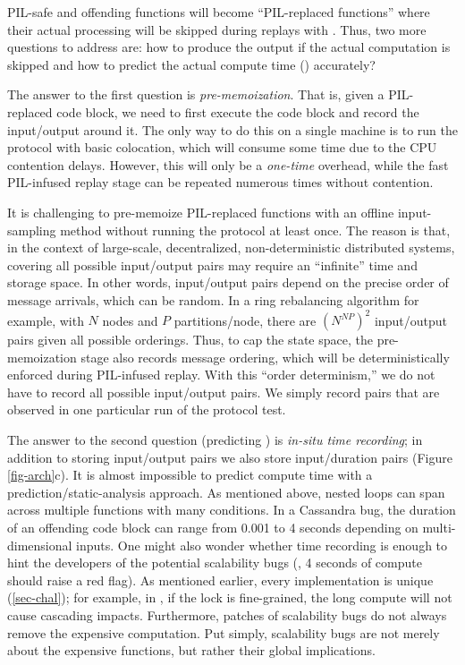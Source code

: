  PIL-safe and offending
functions will become ``PIL-replaced functions'' where their actual
processing will be skipped during replays with .
%
Thus, two more questions to address are: how to produce the output if the
actual computation is skipped and how to predict the actual compute time
() accurately?


The answer to the first question is {\em pre-memoization}.  That is, given
a PIL-replaced code block, we need to first execute the code block and
record the input/output around it.
%
The only way to do this on a single machine is to run the protocol with
basic colocation, which will consume some time due to the CPU contention
delays.
%
However, this will only be a {\em one-time} overhead, while the fast
PIL-infused replay stage can be repeated numerous times without
contention.



It is challenging to pre-memoize PIL-replaced functions with an offline
input-sampling method without running the protocol at least once.
%
The reason is that, in the context of large-scale, decentralized,
non-deterministic distributed systems, covering all possible input/output
pairs may require an ``infinite'' time and storage space.
%
In other words, input/output pairs depend on the precise order of message
arrivals, which can be random.
%
In a ring rebalancing algorithm for example, with $N$ nodes and $P$
partitions/node, there are $(N^{NP})^2$ input/output pairs given all
possible orderings.
%
Thus, to cap the state space, the pre-memoization stage also records
message ordering, which will be deterministically enforced during
PIL-infused replay.  With this ``order determinism,'' we do not have to
record all possible input/output pairs.  We simply record pairs that are
observed in one particular run of the protocol test.


The answer to the second question (predicting ) is {\em in-situ time
  recording}; in addition to storing input/output pairs we also store
input/duration pairs (Figure \ref{fig-arch}c).
%
It is almost impossible to predict compute time with a
prediction/static-analysis approach.
%
As mentioned above, nested loops can span across multiple functions with
many  conditions.  In a Cassandra bug, the duration of an
offending code block can range from 0.001 to 4 seconds depending on 
multi-dimensional inputs.
%
One might also wonder whether time recording is enough to hint the
developers of the potential scalability bugs (\eg, 4 seconds of compute
should raise a red flag).
%
As mentioned earlier, every implementation is unique (\sec\ref{sec-chal});
for example, in , if the lock is fine-grained, the long compute
will not cause cascading impacts.
%
Furthermore, patches of scalability bugs do not always remove the
expensive computation.
%
Put simply, scalability bugs are not merely about the expensive functions,
but rather their global implications.





